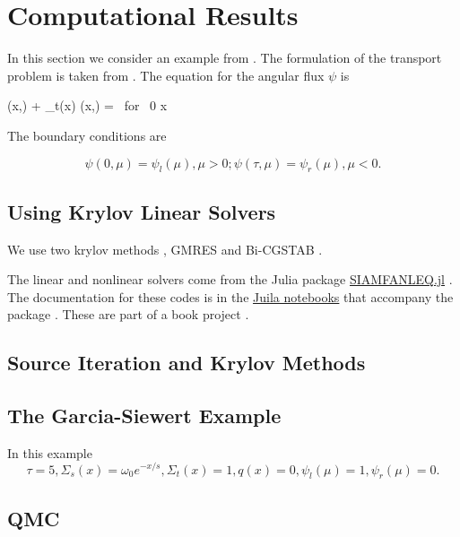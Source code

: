 \section{Computational Results}
\label{sec:results}
In this section we consider an example from
\cite{cesinh}. The formulation of the transport
problem is taken from \cite{ctk:jeff1}. The equation for the angular
flux \(\psi\) is

\begeq
\label{eq:transportgs}
\mu {} (x,\mu) + \Sigma_t(x) \psi(x,\mu) =
 
 \mbox{ for } 0 \le x \le \tau
\endeq

The boundary conditions are

\[
\psi(0, \mu) = \psi_l(\mu), \mu > 0; \psi(\tau, \mu) = \psi_r(\mu),
\mu < 0.
\]

\subsection{Using Krylov Linear Solvers}
\label{subsec:krylov}

We use two krylov methods \cite{ctk:roots}, GMRES \cite{gmres} and
Bi-CGSTAB \cite{bicgstab}.

The linear and nonlinear solvers come from the Julia package
\href{https://github.com/ctkelley/SIAMFANLEquations.jl}{SIAMFANLEQ.jl}
\cite{ctk:siamfanl}. The documentation for these codes is in the
\href{https://github.com/ctkelley/NotebookSIAMFANL}{Juila notebooks}
that accompany the package \cite{ctk:notebooknl}. 
These are part of a book project \cite{ctk:fajulia}. 

\subsection{Source Iteration and Krylov Methods}

\subsection{The Garcia-Siewert Example}
\label{subsec:garcia}

In this example 
\[
\tau=5, \Sigma_s(x) =\omega_0 e^{-x/s},  \Sigma_t(x) = 1, q(x) = 0, \psi_l(\mu) = 1, \psi_r(\mu) = 0.
\]

\subsection{QMC}\label{qmc}


